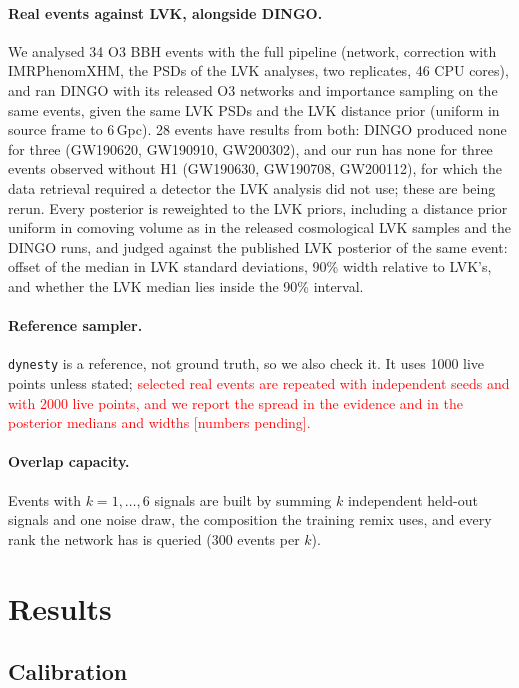 \documentclass[twocolumn,linenumbers]{aastex701}
\newcommand{\pending}[1]{\textcolor{red}{#1}}
\begin{document}
\paragraph{Real events against LVK, alongside DINGO.} We analysed 34 O3 BBH
events with the full pipeline (network, correction with IMRPhenomXHM, the
PSDs of the LVK analyses, two replicates, 46 CPU cores), and ran DINGO
\citep{Dax2021Dingo, Dax2023DingoBns} with its released O3 networks and
importance sampling on the same events, given the same LVK PSDs and the LVK
distance prior (uniform in source frame to 6\,Gpc). 28 events have results from
both: DINGO produced none for three (GW190620, GW190910, GW200302), and our run
has none for three events observed without H1 (GW190630, GW190708,
GW200112), for which the data retrieval required a detector the LVK analysis
did not use; these are being rerun. Every posterior is reweighted to the LVK
priors, including a distance prior uniform in comoving volume as in the
released cosmological LVK samples and the DINGO runs, and judged against the published LVK posterior of the same event:
offset of the median in LVK standard deviations, 90\% width relative to LVK's,
and whether the LVK median lies inside the 90\% interval.

\paragraph{Reference sampler.} \texttt{dynesty} is a reference, not ground truth, so
we also check it. It uses 1000 live points unless stated; \pending{selected real events are
repeated with independent seeds and with 2000 live points, and we report the spread in the
evidence and in the posterior medians and widths [numbers pending].}

\paragraph{Overlap capacity.} Events with $k=1,\dots,6$ signals are built by
summing $k$ independent held-out signals and one noise draw, the composition
the training remix uses, and every rank the network has is queried (300 events
per $k$).

\section{Results} \label{sec:results}

\subsection{Calibration} \label{sec:calibration}
\end{document}
